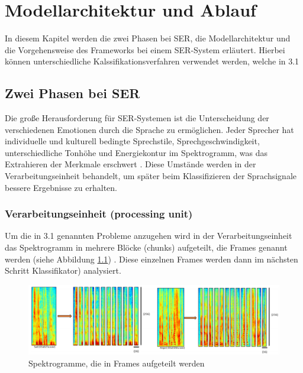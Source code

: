 \chapter{Modellarchitektur und Ablauf}

In diesem Kapitel werden die zwei Phasen bei SER, die Modellarchitektur und die Vorgehensweise des Frameworks bei einem SER-System erläutert. Hierbei können unterschiedliche Kalssifikationsverfahren verwendet werden, welche in 3.1  


\section{Zwei Phasen bei SER}

Die große Herausforderung für SER-Systemen ist die Unterscheidung der verschiedenen Emotionen durch die Sprache zu ermöglichen. Jeder Sprecher hat individuelle und kulturell bedingte Sprechstile, Sprechgeschwindigkeit, unterschiedliche Tonhöhe und Energiekontur im Spektrogramm, was das Extrahieren der Merkmale erschwert \cite{badshah2019deep}. Diese Umstände werden in der Verarbeitungseinheit behandelt, um später beim Klassifizieren der Sprachsignale bessere  Ergebnisse zu erhalten. 
\subsection{Verarbeitungseinheit (processing unit)}
Um die in 3.1 genannten Probleme anzugehen wird in der Verarbeitungseinheit das Spektrogramm in mehrere Blöcke (chunks) aufgeteilt, die Frames genannt werden (siehe Abbildung \ref{frames}) \cite{badshah2019deep}. Diese einzelnen Frames werden dann im nächsten Schritt Klassifikator) analysiert. 
\begin{figure}
	\centering
	\includegraphics[width=1\textwidth]{images/frames}
	\caption{\label{frames}Spektrogramme, die in Frames aufgeteilt werden \cite{badshah2019deep}}
\end{figure}
